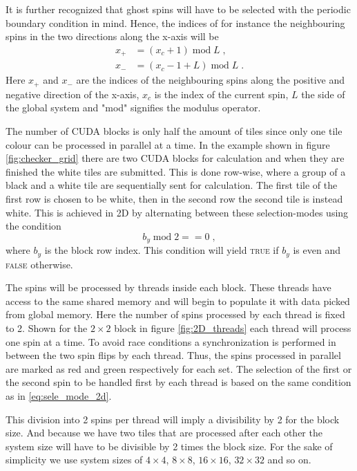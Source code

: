 \documentclass[paper=a4, fontsize=11pt]{scrartcl} %
\numberwithin{equation}{section} %
\numberwithin{figure}{section} %
\numberwithin{table}{section} %
\begin{document}
It is further recognized that ghost spins will have to be selected with the periodic boundary condition in mind. Hence, the indices of for instance the neighbouring spins in the two directions along the x-axis will be
\begin{align*}
x_+&=(x_c+1)\; \text{mod} \; L \;, \\
x_-&=(x_c-1+L) \; \text{mod} \; L \;.
\end{align*}
Here $x_+$ and $x_-$ are the indices of the neighbouring spins along the positive and negative direction of the x-axis, $x_c$ is the index of the current spin, $L$ the side of the global system and "mod" signifies the modulus operator.

The number of CUDA blocks is only half the amount of tiles since only one tile colour can be processed in parallel at a time. In the example shown in figure \ref{fig:checker_grid} there are two CUDA blocks for calculation and when they are finished the white tiles are submitted. This is done row-wise, where a group of a black and a white tile are sequentially sent for calculation. The first tile of the first row is chosen to be white, then in the second row the second tile is instead white. This is achieved in 2D by alternating between these selection-modes using the condition 
\begin{equation}
b_y\; \text{mod} \; 2 == 0 \;,
\label{eq:sele_mode_2d}
\end{equation}
where $b_y$ is the block row index. This condition will yield \textsc{true} if $b_y$ is even and \textsc{false} otherwise.

The spins will be processed by threads inside each block. These threads have access to the same shared memory and will begin to populate it with data picked from global memory. Here the number of spins processed by each thread is fixed to 2. Shown for the $2\times2$ block in figure \ref{fig:2D_threads} each thread will process one spin at a time. To avoid race conditions a synchronization is performed in between the two spin flips by each thread. Thus, the spins processed in parallel are marked as red and green respectively for each set. The selection of the first or the second spin to be handled first by each thread is based on the same condition as in \ref{eq:sele_mode_2d}.
 
This division into 2 spins per thread will imply a divisibility by 2 for the block size. And because we have two tiles that are processed after each other the system size will have to be divisible by 2 times the block size. For the sake of simplicity we use system sizes of $4\times4$, $8\times8$, $16\times16$, $32\times32$ and so on.
\end{document}
